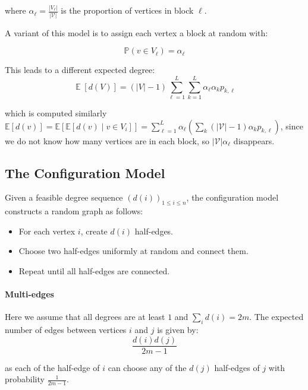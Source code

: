 \documentclass{article}
\begin{document}
where $\alpha_{\ell} = \frac{|V_{\ell}|}{|\mathcal{V}|}$ is the proportion of vertices in block $\ell$.

A variant of this model is to assign each vertex a block at random with:  

\begin{equation*}
    \mathbb{P}(v\in V_{\ell}) = \alpha_{\ell}
\end{equation*}  

This leads to a different expected degree:
 \begin{equation*}
    \operatorname{\mathbb{E}}[d(V)]=(|V|-1)\sum_{\ell=1}^{L}\sum_{k=1}^{L}\alpha_{\ell}\alpha_{k}p_{k,\ell}
 \end{equation*}

 which is computed similarly $\mathbb{E}[d(v)]=\mathbb{E}[\mathbb{E}[d(v) \mid v \in V_i]]=\sum_{\ell=1}^{L}\alpha_{\ell}\left(\sum_{k}(|\mathcal{V}|-1)\alpha_{k} p_{k, \ell}\right)$, since we do not know how many vertices are in each block, so $|\mathcal{V}|\alpha_{\ell}$ disappears.



\subsection{The Configuration Model}  
Given a feasible degree sequence $(d(i))_{1\leq i \leq n}$, the configuration model constructs a random graph as follows: 
\begin{itemize}
    \item For each vertex $i$, create $d(i)$ half-edges.
    \item Choose two half-edges uniformly at random and connect them.
    \item Repeat until all half-edges are connected.
\end{itemize}

\paragraph{Multi-edges} Here we assume that all degrees are at least $1$ and $\sum_i d(i) = 2m$. The expected number of edges between vertices $i$ and $j$ is given by:
\begin{equation*}
    \frac{d(i)d(j)}{2m-1}
\end{equation*}

as each of the half-edge of $i$ can choose any of the $d(j)$ half-edges of $j$ with probability $\frac{1}{2m-1}$.  
\end{document}
